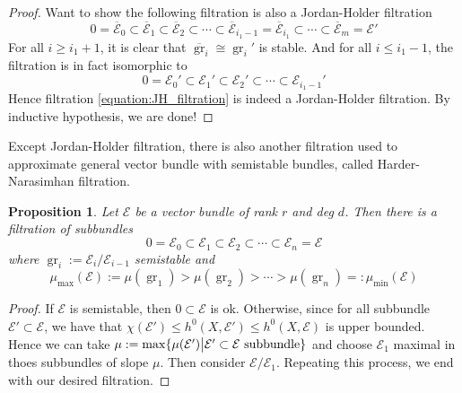 \documentclass{ctexart}
\newtheorem{proposition}{Proposition}[section]
\newcommand{\grade}{\operatorname{gr}}
\begin{document}
\begin{proof}
    Want to show the following filtration is also a Jordan-Holder filtration
    \begin{equation}
        0 = \overline{\mathcal{E}}_{0} \subset \overline{\mathcal{E}}_{1} \subset \overline{\mathcal{E}}_{2} \subset \cdots \subset \overline{\mathcal{E}}_{i_{1} - 1} = \overline{\mathcal{E}}_{i_{1}} \subset \cdots \subset \overline{\mathcal{E}}_{m} = \mathcal{E}'
        \label{equation:JH_filtration}
    \end{equation}
    For all $i \ge i_{1} + 1$, it is clear that $\overline{\grade}_{i} \cong \grade_{i}'$ is stable.
    And for all $i \le i_{1} - 1$, the filtration is in fact isomorphic to
    \begin{equation}
        0 = \mathcal{E}_{0}' \subset \mathcal{E}_{1}' \subset \mathcal{E}_{2}' \subset \cdots \subset \mathcal{E}_{i_{1} - 1}'
    \end{equation}
    Hence filtration \ref{equation:JH_filtration} is indeed a Jordan-Holder filtration.
    By inductive hypothesis, we are done!
\end{proof}
Except Jordan-Holder filtration, there is also another filtration used to approximate general vector bundle with semistable bundles, called Harder-Narasimhan filtration.
\begin{proposition}
    Let $\mathcal{E}$ be a vector bundle of rank $r$ and deg $d$.
    Then there is a filtration of subbundles
    \begin{equation}
        0 = \mathcal{E}_{0} \subset \mathcal{E}_{1} \subset \mathcal{E}_{2} \subset \cdots \subset \mathcal{E}_{n} = \mathcal{E}        
    \end{equation}
    where $\grade_{i} := \mathcal{E}_{i}/\mathcal{E}_{i - 1}$ semistable and 
    \begin{equation}
        \mu_{\max}(\mathcal{E}) := \mu(\grade_{1}) > \mu(\grade_{2}) > \cdots > \mu(\grade_{n}) =: \mu_{\min}(\mathcal{E})
    \end{equation}
    \vspace{-\baselineskip} %
    \label{Proposition 7.10}
\end{proposition}
\begin{proof}
    If $\mathcal{E}$ is semistable, then $0 \subset \mathcal{E}$ is ok.
    Otherwise, since for all subbundle $\mathcal{E}' \subset \mathcal{E}$,
    we have that $\chi(\mathcal{E}') \le h^{0}(X, \mathcal{E}') \le h^{0}(X,\mathcal{E})$ is upper bounded.
    Hence we can take $\mu := \max\{\mu(\mathcal{E}') \big{|} \mathcal{E}' \subset \mathcal{E} \text{ subbundle}\}$ and choose $\mathcal{E}_{1}$ maximal in thoes subbundles of slope $\mu$.
    Then consider $\mathcal{E}/\mathcal{E}_{1}$.
    Repeating this process, we end with our desired filtration.
\end{proof}
\end{document}
